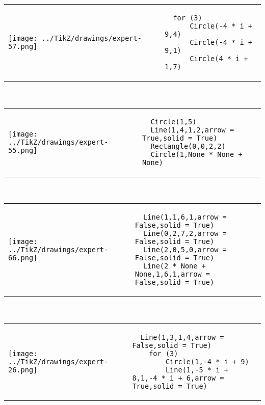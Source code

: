         \begin{tabular}{ll}
\texttt{[image: ../TikZ/drawings/expert-57.png]}&
        \begin{minipage}{10cm}
        \begin{verbatim}
  for (3)
      Circle(-4 * i + 9,4)
      Circle(-4 * i + 9,1)
      Circle(4 * i + 1,7)
        \end{verbatim}
\end{minipage}
\end{tabular}        
        \\

        \begin{tabular}{ll}
\texttt{[image: ../TikZ/drawings/expert-55.png]}&
        \begin{minipage}{10cm}
        \begin{verbatim}
  Circle(1,5)
  Line(1,4,1,2,arrow = True,solid = True)
  Rectangle(0,0,2,2)
  Circle(1,None * None + None)
        \end{verbatim}
\end{minipage}
\end{tabular}        
        \\

        \begin{tabular}{ll}
\texttt{[image: ../TikZ/drawings/expert-66.png]}&
        \begin{minipage}{10cm}
        \begin{verbatim}
  Line(1,1,6,1,arrow = False,solid = True)
  Line(0,2,7,2,arrow = False,solid = True)
  Line(2,0,5,0,arrow = False,solid = True)
  Line(2 * None + None,1,6,1,arrow = False,solid = True)
        \end{verbatim}
\end{minipage}
\end{tabular}        
        \\

        \begin{tabular}{ll}
\texttt{[image: ../TikZ/drawings/expert-26.png]}&
        \begin{minipage}{10cm}
        \begin{verbatim}
  Line(1,3,1,4,arrow = False,solid = True)
    for (3)
        Circle(1,-4 * i + 9)
        Line(1,-5 * i + 8,1,-4 * i + 6,arrow = True,solid = True)
        \end{verbatim}
\end{minipage}
\end{tabular}        
        \\

